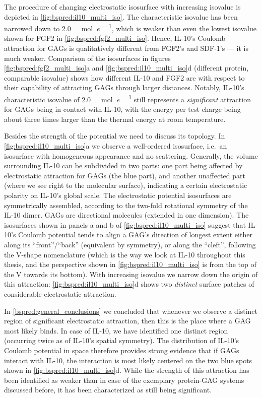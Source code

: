 The procedure of changing electrostatic isosurface with increasing isovalue is
depicted in \cref{fig:bspred:il10_multi_iso}. The characteristic isovalue has
been narrowed down to \SI{2.0}{\kilo\calory\per\mole\per\elementarycharge},
which is weaker than even the lowest isovalue shown for FGF2 in
\cref{fig:bspred:fgf2_multi_iso}. Hence, IL-10's Coulomb attraction for GAGs
is qualitatively different from FGF2's and SDF-1's --- it is much weaker.
Comparison of the isosurfaces in figures \ref{fig:bspred:fgf2_multi_iso}a and
\ref{fig:bspred:il10_multi_iso}d (different protein, comparable isovalue) shows
how different IL-10 and FGF2 are with respect to their capability of attracting
GAGs through larger distances. Notably, IL-10's characteristic isovalue of
\SI{2.0}{\kilo\calory\per\mole\per\elementarycharge} still represents a
\textit{significant} attraction for GAGs being in contact with IL-10, with the
energy per test charge being about three times larger than the thermal energy at
room temperature.

Besides the strength of the potential we need to discuss its topology. In
\cref{fig:bspred:il10_multi_iso}a we observe a well-ordered isosurface, i.e.\ an
isosurface with homogeneous appearance and no scattering. Generally, the volume
surrounding IL-10 can be subdivided in two parts: one part being affected by
electrostatic attraction for GAGs (the blue part), and another unaffected part
(where we see right to the molecular surface), indicating a certain
electrostatic polarity on IL-10's global scale. The electrostatic potential
isosurfaces are symmetrically assembled, according to the two-fold rotational
symmetry of the IL-10 dimer. GAGs are directional molecules (extended in one
dimension). The isosurfaces shown in panels a and b of
\cref{fig:bspred:il10_multi_iso} suggest that IL-10's Coulomb potential tends to
align a GAG's direction of longest extent either along its
\enquote{front}/\enquote{back} (equivalent by symmetry), or along the
\enquote{cleft}, following the V-shape nomenclature (which is the way we look at
IL-10 throughout this thesis, and the perspective shown in
\cref{fig:bspred:il10_multi_iso} is from the top of the V towards its bottom).
With increasing isovalue we narrow down the origin of this attraction:
\cref{fig:bspred:il10_multi_iso}d shows two \textit{distinct} surface patches of
considerable electrostatic attraction.

In \cref{bspred:general_conclusions} we concluded that whenever we observe a
distinct region of significant electrostatic attraction, then this is the place
where a GAG most likely binds. In case of IL-10, we have identified one distinct
region (occurring twice as of IL-10's spatial symmetry). The distribution of
IL-10's Coulomb potential in space therefore provides strong evidence that if
GAGs interact with IL-10, the interaction is most likely centered on the two
blue spots shown in \cref{fig:bspred:il10_multi_iso}d. While the strength of
this attraction has been identified as weaker than in case of the exemplary
protein-GAG systems discussed before, it has been characterized as still being
significant.


